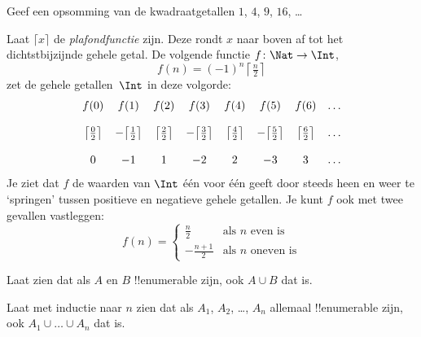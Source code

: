 \documentclass[openany]{memoir}
\begin{document}
\begin{prob}
Geef een opsomming van de kwadraatgetallen $1$, $4$, $9$, $16$, \dots
\end{prob}

\begin{ex}
Laat $\lceil x \rceil$ de \emph{plafondfunctie} zijn. Deze rondt $x$
naar boven af tot het dichtstbijzijnde gehele getal. De volgende
functie $f \colon \Nat \to \Int$,
\[
  f(n) = (-1)^{n} \left\lceil\tfrac{n}{2}\right\rceil
\]
zet de gehele getallen~$\Int$ in deze volgorde:
\[
\begin{array}{c c c c c c c c}
f(0) & f(1) & f(2) & f(3) & f(4) & f(5) & f(6) & \dots \\ \\
\big\lceil \tfrac{0}{2} \big\rceil & -\big\lceil \tfrac{1}{2}\big\rceil &  \big\lceil \tfrac{2}{2} \big\rceil & -\big\lceil \tfrac{3}{2} \big\rceil & \big\lceil \tfrac{4}{2} \big\rceil  & -\big\lceil \tfrac{5}{2}\big\rceil & \big\lceil \tfrac{6}{2} \big\rceil & \dots \\ \\
0 & -1 & 1 & -2 & 2 & -3 & 3& \dots
\end{array}
\]
Je ziet dat $f$ de waarden van $\Int$ één voor één geeft door steeds
heen en weer te ‘springen’ tussen positieve en negatieve gehele getallen. Je kunt
$f$ ook met twee gevallen vastleggen:
\[
f(n) = \begin{cases}
  \frac{n}{2} & \text{als $n$ even is}\\
  -\frac{n+1}{2} & \text{als $n$ oneven is}
  \end{cases}
\]
\end{ex}

\begin{prob}
Laat zien dat als $A$ en $B$ !!{enumerable} zijn, ook $A \cup B$ dat
is.
\end{prob}

\begin{prob}
Laat met inductie naar $n$ zien dat als $A_1$, $A_2$, \dots, $A_n$
allemaal !!{enumerable} zijn, ook $A_1 \cup \dots \cup A_n$ dat is.
\end{prob}
\endgroup

\begingroup
\def\olfilename{OLP-0039}
\def\olfilepath{content/sets-functions-relations/size-of-sets/}
\hypertarget{unit-OLP-0039}{}
\end{document}
